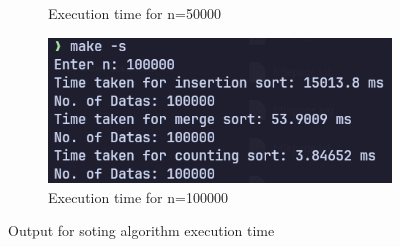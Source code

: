 \begin{figure}[H]
\begin{subfigure}[b]{0.4\textwidth}
        \caption{Execution time for n=50000}
    \end{subfigure}
    \hfill
    \begin{subfigure}[b]{0.4\textwidth}
        \centering
        \includegraphics[width=\textwidth]{./img/out-4.png}
        \caption{Execution time for n=100000}
    \end{subfigure}
    
    \caption{Output for soting algorithm execution time}
    \label{fig:task1}

\end{figure}

